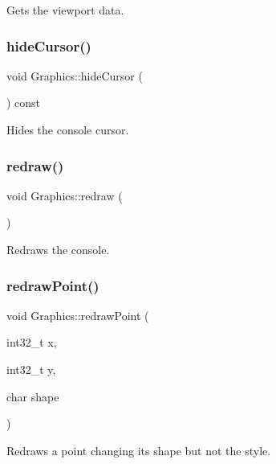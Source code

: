 Gets the viewport data. 

\mbox{\label{class_graphics_a99b40f5926338922848e8c85b235e592}} 
\subsubsection{\texorpdfstring{hideCursor()}{hideCursor()}}
{\footnotesize\ttfamily void Graphics\+::hide\+Cursor (\begin{DoxyParamCaption}{ }\end{DoxyParamCaption}) const}



Hides the console cursor. 

\mbox{\label{class_graphics_abce7a73469960b556645afe23cb37ef9}} 
\subsubsection{\texorpdfstring{redraw()}{redraw()}}
{\footnotesize\ttfamily void Graphics\+::redraw (\begin{DoxyParamCaption}{ }\end{DoxyParamCaption})}



Redraws the console. 

\mbox{\label{class_graphics_a6597cd34b1aaddd828259e29db4043f1}} 
\subsubsection{\texorpdfstring{redrawPoint()}{redrawPoint()}}
{\footnotesize\ttfamily void Graphics\+::redraw\+Point (\begin{DoxyParamCaption}\item[{int32\+\_\+t}]{x,  }\item[{int32\+\_\+t}]{y,  }\item[{char}]{shape }\end{DoxyParamCaption})}



Redraws a point changing its shape but not the style. 


